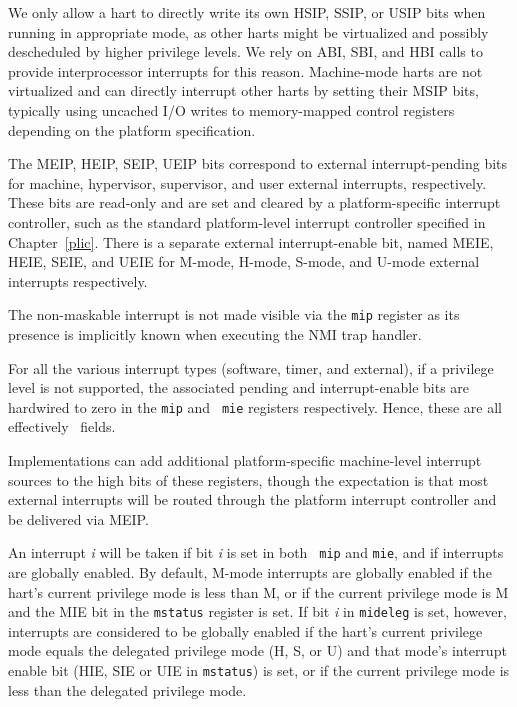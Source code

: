 \begin{commentary}
We only allow a hart to directly write its own HSIP, SSIP, or USIP
bits when running in appropriate mode, as other harts might be
virtualized and possibly descheduled by higher privilege levels.  We
rely on ABI, SBI, and HBI calls to provide interprocessor interrupts
for this reason.  Machine-mode harts are not virtualized and can
directly interrupt other harts by setting their MSIP bits, typically
using uncached I/O writes to memory-mapped control registers depending
on the platform specification.
\end{commentary}

The MEIP, HEIP, SEIP, UEIP bits correspond to external
interrupt-pending bits for machine, hypervisor, supervisor, and user
external interrupts, respectively.  These bits are read-only and are
set and cleared by a platform-specific interrupt controller, such as
the standard platform-level interrupt controller specified in
Chapter~\ref{plic}.  There is a separate external interrupt-enable
bit, named MEIE, HEIE, SEIE, and UEIE for M-mode, H-mode, S-mode, and
U-mode external interrupts respectively.

\begin{commentary}
The non-maskable interrupt is not made visible via the {\tt mip}
register as its presence is implicitly known when executing the NMI
trap handler.
\end{commentary}

For all the various interrupt types (software, timer, and external),
if a privilege level is not supported, the associated pending and
interrupt-enable bits are hardwired to zero in the {\tt mip} and {\tt
  mie} registers respectively.  Hence, these are all effectively
\warl\ fields.

\begin{commentary}
Implementations can add additional platform-specific machine-level
interrupt sources to the high bits of these registers, though the
expectation is that most external interrupts will be routed through
the platform interrupt controller and be delivered via MEIP.
\end{commentary}

An interrupt {\em i} will be taken if bit {\em i} is set in both {\tt
  mip} and {\tt mie}, and if interrupts are globally enabled.  By
default, M-mode interrupts are globally enabled if the hart's current
privilege mode is less than M, or if the current privilege mode is M
and the MIE bit in the {\tt mstatus} register is set.  If bit {\em i}
in {\tt mideleg} is set, however, interrupts are considered to be
globally enabled if the hart's current privilege mode equals the
delegated privilege mode (H, S, or U) and that mode's interrupt enable
bit (HIE, SIE or UIE in {\tt mstatus}) is set, or if the current
privilege mode is less than the delegated privilege mode.

